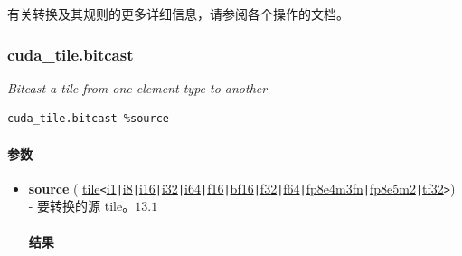 \documentclass{article}
\begin{document}
有关转换及其规则的更多详细信息，请参阅各个操作的文档。


\subsubsection{cuda\_tile.bitcast}

\textit{Bitcast a tile from one element type to another}


\begin{lstlisting}
cuda_tile.bitcast %source
\end{lstlisting}

\paragraph{参数}

\begin{itemize}
\item \textbf{source} ( \href{https://docs.nvidia.com/cuda/tile-ir/latest/sections/types.html#type-tile}{tile}\texttt{<}\href{https://docs.nvidia.com/cuda/tile-ir/latest/sections/types.html#subsection-element-types}{i1}\texttt{|}\href{https://docs.nvidia.com/cuda/tile-ir/latest/sections/types.html#subsection-element-types}{i8}\texttt{|}\href{https://docs.nvidia.com/cuda/tile-ir/latest/sections/types.html#subsection-element-types}{i16}\texttt{|}\href{https://docs.nvidia.com/cuda/tile-ir/latest/sections/types.html#subsection-element-types}{i32}\texttt{|}\href{https://docs.nvidia.com/cuda/tile-ir/latest/sections/types.html#subsection-element-types}{i64}\texttt{|}\href{https://docs.nvidia.com/cuda/tile-ir/latest/sections/types.html#subsection-element-types}{f16}\texttt{|}\href{https://docs.nvidia.com/cuda/tile-ir/latest/sections/types.html#subsection-element-types}{bf16}\texttt{|}\href{https://docs.nvidia.com/cuda/tile-ir/latest/sections/types.html#subsection-element-types}{f32}\texttt{|}\href{https://docs.nvidia.com/cuda/tile-ir/latest/sections/types.html#subsection-element-types}{f64}\texttt{|}\href{https://docs.nvidia.com/cuda/tile-ir/latest/sections/types.html#subsection-element-types}{fp8e4m3fn}\texttt{|}\href{https://docs.nvidia.com/cuda/tile-ir/latest/sections/types.html#subsection-element-types}{fp8e5m2}\texttt{|}\href{https://docs.nvidia.com/cuda/tile-ir/latest/sections/types.html#subsection-element-types}{tf32}\texttt{>}) - 要转换的源 tile。$\boxed{13.1}$


\paragraph{结果}


\end{itemize}
\end{document}
